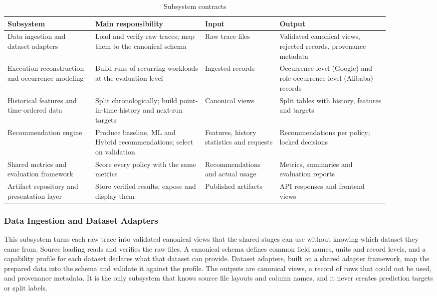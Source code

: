 \begin{table}[!t]
\centering
\footnotesize
\caption{Subsystem contracts}\label{tab:2.1}
\begin{tabular}{>{\raggedright\arraybackslash}p{0.203\linewidth}>{\raggedright\arraybackslash}p{0.258\linewidth}>{\raggedright\arraybackslash}p{0.170\linewidth}>{\raggedright\arraybackslash}p{0.258\linewidth}}
\hline
\textbf{Subsystem} & \textbf{Main responsibility} & \textbf{Input} & \textbf{Output} \\ \hline
Data ingestion and dataset adapters & Load and verify raw traces; map them to the canonical schema & Raw trace files & Validated canonical views, rejected records, provenance metadata \\
Execution reconstruction and occurrence modeling & Build runs of recurring workloads at the evaluation level & Ingested records & Occurrence-level (Google) and role-occurrence-level (Alibaba) records \\
Historical features and time-ordered data & Split chronologically; build point-in-time history and next-run targets & Canonical views & Split tables with history, features and targets \\
Recommendation engine & Produce baseline, ML and Hybrid recommendations; select on validation & Features, history statistics and requests & Recommendations per policy; locked decisions \\
Shared metrics and evaluation framework & Score every policy with the same metrics & Recommendations and actual usage & Metrics, summaries and evaluation reports \\
Artifact repository and presentation layer & Store verified results; expose and display them & Published artifacts & API responses and frontend views \\
\hline
\end{tabular}
\end{table}

\subsubsection{Data Ingestion and Dataset Adapters}\label{sec:2.2.1}

This subsystem turns each raw trace into validated canonical views that the shared stages can use without knowing which dataset they came from. Source loading reads and verifies the raw files. A canonical schema defines common field names, units and record levels, and a capability profile for each dataset declares what that dataset can provide. Dataset adapters, built on a shared adapter framework, map the prepared data into the schema and validate it against the profile. The outputs are canonical views, a record of rows that could not be used, and provenance metadata. It is the only subsystem that knows source file layouts and column names, and it never creates prediction targets or split labels.

